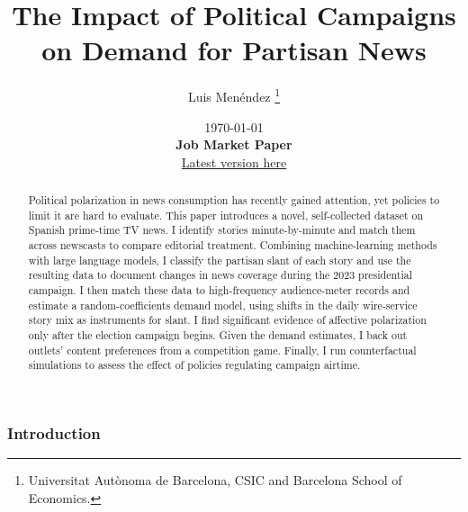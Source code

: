 \documentclass[12pt]{article}
\title{The Impact of Political Campaigns on Demand for Partisan News}
\author{Luis  Menéndez \thanks{Universitat Autònoma de Barcelona, CSIC and Barcelona School of Economics.}} %
\date{%
	\today\\[2ex]
	{\bfseries Job Market Paper}\\[1ex]
	{\normalsize\href{https://www.dropbox.com/scl/fi/f3546vufz11vj5r63xml4/elections_draft.pdf?rlkey=exjw9vm3sasahlb54ohjf2tyx\&e=1\&dl=0}{Latest version here}}
}
\renewcommand\thepart{}      %
\renewcommand\partname{}      %
\begin{document}
	
\renewcommand\thepart{}      %
\renewcommand\partname{}      %
	
	
	\maketitle
	
	\begin{abstract}
		

	
		Political polarization in news consumption has recently gained attention, yet policies to limit it are hard to evaluate. This paper introduces a novel, self-collected dataset on Spanish prime-time TV news. I identify stories minute-by-minute and match them across newscasts to compare editorial treatment. Combining machine-learning methods with large language models, I classify the partisan slant of each story and use the resulting data to document changes in news coverage during the 2023 presidential campaign. I then match these data to high-frequency audience-meter records and estimate a random-coefficients demand model, using shifts in the daily wire-service story mix as instruments for slant. I find significant evidence of affective polarization only after the election campaign begins. Given the demand estimates, I back out outlets’ content preferences from a competition game. Finally, I run counterfactual simulations to assess the effect of policies regulating campaign airtime. 
		
		
	\end{abstract}
	
	


		\doparttoc %
	\faketableofcontents %
		\part{} %
		
	
	\clearpage
	

	
	

	

	
	
	\section{Introduction}
	
\end{document}

